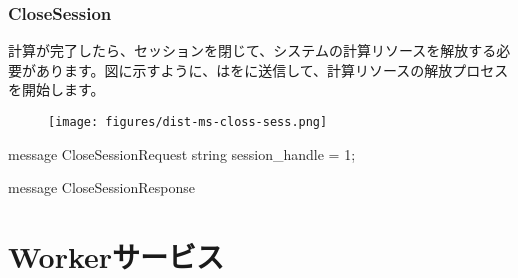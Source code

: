 \begin{content}
\subsubsection{CloseSession}

計算が完了したら、セッションを閉じて、システムの計算リソースを解放する必要があります。図に示すように、はをに送信して、計算リソースの解放プロセスを開始します。

\begin{figure}[H]
\centering
\texttt{[image: figures/dist-ms-closs-sess.png]}
\caption{}
 \label{fig:dist-ms-closs-sess}
\end{figure}

\begin{leftbar}
\begin{c++}
message CloseSessionRequest {
  string session_handle = 1;
}

message CloseSessionResponse {
}
\end{c++}
\end{leftbar}

\end{content}

\section{Workerサービス}

